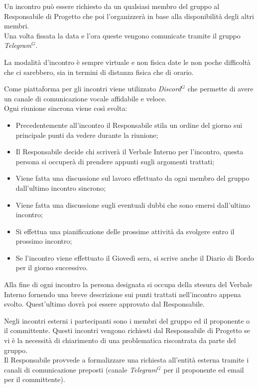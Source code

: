             Un incontro può essere richiesto da un qualsiasi membro del gruppo al Responsabile di Progetto che poi l'organizzerà in base alla disponibilità degli altri membri. \\
            Una volta fissata la data e l'ora queste vengono comunicate tramite il gruppo \emph{Telegram}$^{G}$.

            La modalità d'incontro è sempre virtuale e non fisica date le non poche difficoltà che ci sarebbero, sia in termini di distanza fisica che di orario.

            Come piattaforma per gli incontri viene utilizzato \emph{Discord}$^{G}$ che permette di avere un canale di comunicazione vocale affidabile e veloce.\\

            Ogni riunione sincrona viene così svolta:

\begin{itemize}
\item Precedentemente all'incontro il Responsabile stila un ordine del giorno sui principale punti da vedere durante la riunione;
\item Il Responsabile decide chi scriverà il Verbale Interno per l'incontro, questa persona si occuperà di prendere appunti sugli argomenti trattati;
\item Viene fatta una discussione sul lavoro effettuato da ogni membro del gruppo dall'ultimo incontro sincrono;
\item Viene fatta una discussione sugli eventuali dubbi che sono emersi dall'ultimo incontro;
\item Si effettua una pianificazione delle prossime attività da svolgere entro il prossimo incontro;
\item Se l'incontro viene effettuato il Giovedì sera, si scrive anche il Diario di Bordo per il giorno successivo.
\end{itemize}

            Alla fine di ogni incontro la persona designata si occupa della stesura del Verbale Interno fornendo una breve descrizione sui punti trattati nell'incontro appena svolto.
            Quest'ultimo dovrà poi essere approvato dal Responsabile.


            Negli incontri esterni i partecipanti sono i membri del gruppo ed il proponente o il committente.
            Questi incontri vengono richiesti dal Responsabile di Progetto se vi è la necessità di chiarimento di una problematica riscontrata da parte del gruppo. \\
            Il Responsabile provvede a formalizzare una richiesta all'entità esterna tramite i canali di comunicazione preposti (canale \emph{Telegram}$^{G}$ per il proponente ed email per il committente).\\

